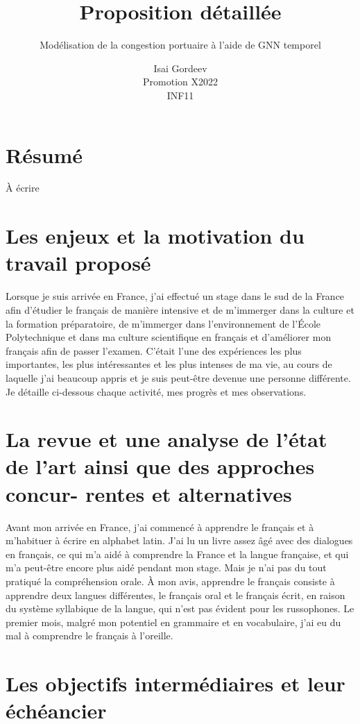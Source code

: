 \documentclass[a4paper,12pt]{article}
\title{Proposition détaillée}
\subtitle{Modélisation de la congestion portuaire à l’aide de GNN temporel}
\author{Isai Gordeev\\
Promotion X2022\\INF11}
\begin{document}
\maketitle

\section*{Résumé}

À écrire

\newpage


\tableofcontents

\newpage

\section{Les enjeux et la motivation du travail proposé}

Lorsque je suis arrivée en France, j'ai effectué un stage dans le sud de la France afin d'étudier le français de manière intensive et de m'immerger dans la culture et la formation préparatoire, de m'immerger dans l'environnement de l'École Polytechnique et dans ma culture scientifique en français et d'améliorer mon français afin de passer l'examen. C'était l'une des expériences les plus importantes, les plus intéressantes et les plus intenses de ma vie, au cours de laquelle j'ai beaucoup appris et je suis peut-être devenue une personne différente. Je détaille ci-dessous chaque activité, mes progrès et mes observations.

\section{La revue et une analyse de l’état de l’art ainsi que des approches concur- rentes et alternatives}

Avant mon arrivée en France, j'ai commencé à apprendre le français et à m'habituer à écrire en alphabet latin. J'ai lu un livre assez âgé avec des dialogues en français, ce qui m'a aidé à comprendre la France et la langue française, et qui m'a peut-être encore plus aidé pendant mon stage. Mais je n'ai pas du tout pratiqué la compréhension orale. À mon avis, apprendre le français consiste à apprendre deux langues différentes, le français oral et le français écrit, en raison du système syllabique de la langue, qui n'est pas évident pour les russophones. Le premier mois, malgré mon potentiel en grammaire et en vocabulaire, j'ai eu du mal à comprendre le français à l'oreille.


\section{Les objectifs intermédiaires et leur échéancier}
\end{document}
